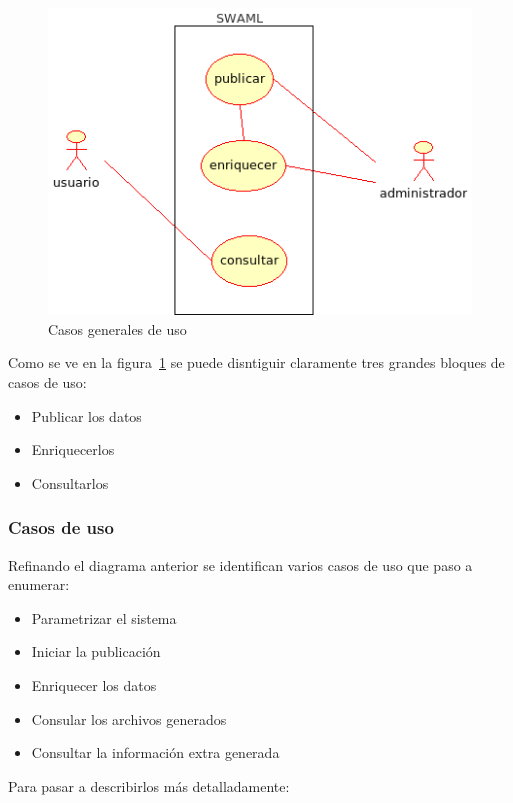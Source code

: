 \begin{figure}[ht]
 	\centering
	\includegraphics[width=12cm]{images/uml/casos-uso/general.png}
	\caption{Casos generales de uso}
	\label{uml:casos-uso}
\end{figure}

Como se ve en la figura~\ref{uml:casos-uso} se puede disntiguir claramente
tres grandes bloques de casos de uso:

\begin{itemize}
 \item Publicar los datos
 \item Enriquecerlos
 \item Consultarlos
\end{itemize}

\subsubsection{Casos de uso}

Refinando el diagrama anterior se identifican varios casos de uso que paso a
enumerar:

\begin{itemize}
 \item Parametrizar el sistema
 \item Iniciar la publicación
 \item Enriquecer los datos
 \item Consular los archivos generados
 \item Consultar la información extra generada
\end{itemize}

Para pasar a describirlos más detalladamente:

